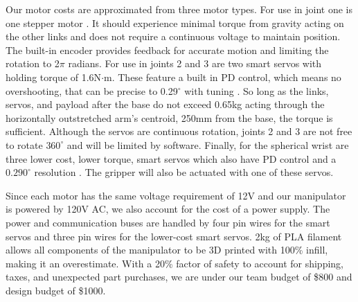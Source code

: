 \documentclass[12pt]{report}
\begin{document}
Our motor costs are approximated from three motor types. For use in joint one is one stepper motor \cite{robotis}. It should experience minimal torque from gravity acting on the other links and does not require a continuous voltage to maintain position. The built-in encoder provides feedback for accurate motion and limiting the rotation to 2$\pi$ radians. For use in joints 2 and 3 are two smart servos with holding torque of 1.6N$\cdot$m. These feature a built in PD control, which means no overshooting, that can be precise to 0.29\(^{\circ}\) with tuning \cite{matterhackers}. So long as the links, servos, and payload after the base do not exceed 0.65kg acting through the horizontally outstretched arm’s centroid, 250mm from the base, the torque is sufficient. Although the servos are continuous rotation, joints 2 and 3 are not free to rotate \(360^{\circ}\) and will be limited by software. Finally, for the spherical wrist are three lower cost, lower torque, smart servos which also have PD control and a \(0.290^{\circ}\) resolution \cite{rev}. The gripper will also be actuated with one of these servos.

Since each motor has the same voltage requirement of 12V and our manipulator is powered by 120V AC, we also account for the cost of a power supply. The power and communication buses are handled by four pin wires for the smart servos and three pin wires for the lower-cost smart servos. 2kg of PLA filament allows all components of the manipulator to be 3D printed with 100\% infill, making it an overestimate. With a 20\% factor of safety to account for shipping, taxes, and unexpected part purchases, we are under our team budget of \$800 and design budget of \$1000.
\end{document}
